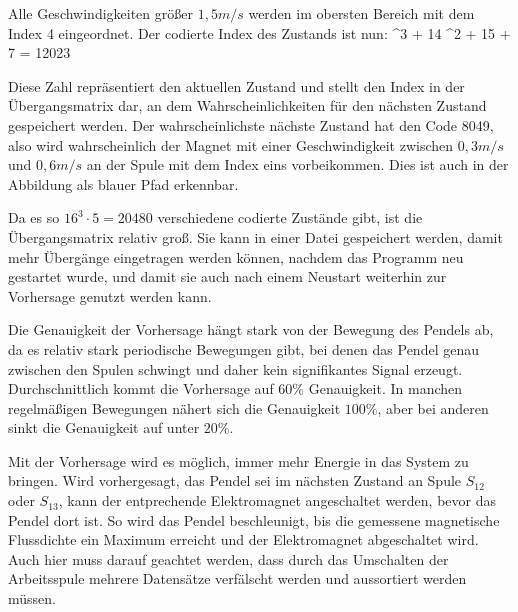 Alle Geschwindigkeiten größer $1,5 m/s$ werden im obersten Bereich mit dem Index 4 eingeordnet.
Der codierte Index des Zustands ist nun:
 ^3 + 14 ^2 + 15  + 7 = 12023
\mathematikstop

Diese Zahl repräsentiert den aktuellen Zustand und stellt den Index in der Übergangsmatrix dar, an dem Wahrscheinlichkeiten für den nächsten Zustand gespeichert werden.
Der wahrscheinlichste nächste Zustand hat den Code 8049, also wird wahrscheinlich der Magnet mit einer Geschwindigkeit zwischen $0,3 m/s$ und $0,6 m/s$ an der Spule mit dem Index eins vorbeikommen.
Dies ist auch in der Abbildung als blauer Pfad erkennbar.

Da es so $16^3 \cdot 5 = 20480$ verschiedene codierte Zustände gibt, ist die Übergangsmatrix relativ groß.
Sie kann in einer Datei gespeichert werden, damit mehr Übergänge eingetragen werden können, nachdem das Programm neu gestartet wurde, und damit sie auch nach einem Neustart weiterhin zur Vorhersage
genutzt werden kann.

Die Genauigkeit der Vorhersage hängt stark von der Bewegung des Pendels ab, da es relativ stark periodische Bewegungen gibt, bei denen das Pendel genau zwischen den Spulen schwingt und daher kein signifikantes Signal erzeugt.
Durchschnittlich kommt die Vorhersage auf $60\%$ Genauigkeit.
In manchen regelmäßigen Bewegungen nähert sich die Genauigkeit $100\%$, aber bei anderen sinkt die Genauigkeit auf unter $20\%$.

Mit der Vorhersage wird es möglich, immer mehr Energie in das System zu bringen.
Wird vorhergesagt, das Pendel sei im nächsten Zustand an Spule $S_{12}$ oder $S_{13}$, kann der entprechende Elektromagnet angeschaltet werden, bevor das Pendel dort ist.
So wird das Pendel beschleunigt, bis die gemessene magnetische Flussdichte ein Maximum erreicht und der Elektromagnet abgeschaltet wird.
Auch hier muss darauf geachtet werden, dass durch das Umschalten der Arbeitsspule mehrere Datensätze verfälscht werden und aussortiert werden müssen.

